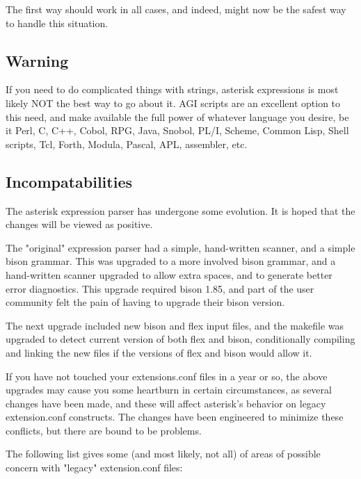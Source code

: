 The first way should work in all cases, and indeed, might now
be the safest way to handle this situation.

\subsection{Warning}

If you need to do complicated things with strings, asterisk expressions
is most likely NOT the best way to go about it. AGI scripts are an
excellent option to this need, and make available the full power of
whatever language you desire, be it Perl, C, C++, Cobol, RPG, Java,
Snobol, PL/I, Scheme, Common Lisp, Shell scripts, Tcl, Forth, Modula,
Pascal, APL, assembler, etc.

\subsection{Incompatabilities}

The asterisk expression parser has undergone some evolution. It is hoped
that the changes will be viewed as positive.

The "original" expression parser had a simple, hand-written scanner,
and a simple bison grammar. This was upgraded to a more involved bison
grammar, and a hand-written scanner upgraded to allow extra spaces,
and to generate better error diagnostics. This upgrade required bison
1.85, and part of the user community felt the pain of having to
upgrade their bison version.

The next upgrade included new bison and flex input files, and the makefile
was upgraded to detect current version of both flex and bison, conditionally
compiling and linking the new files if the versions of flex and bison would
allow it.

If you have not touched your extensions.conf files in a year or so, the
above upgrades may cause you some heartburn in certain circumstances, as
several changes have been made, and these will affect asterisk's behavior on
legacy extension.conf constructs.  The changes have been engineered
to minimize these conflicts, but there are bound to be problems.

The following list gives some (and most likely, not all) of areas
of possible concern with "legacy" extension.conf files:

